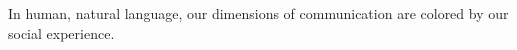 

In human, natural language, our dimensions of communication are
colored by our social experience.

\bye

